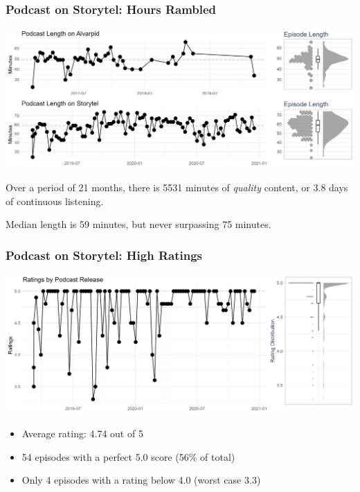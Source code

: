 \begin{frame}
    \frametitle{Podcast on Storytel: Hours Rambled}
    \includegraphics[width=\textwidth]{../R/figures/iskisur_length}

    Over a period of 21 months, there is 5531 minutes of \emph{quality} content, or 3.8 days of continuous
    listening.

    Median length is 59 minutes, but never surpassing 75 minutes.

\end{frame}

\begin{frame}
    \frametitle{Podcast on Storytel: High Ratings}
    \includegraphics[width=\textwidth]{../R/figures/iskisur_ratings}
    \begin{itemize}
        \item Average rating: 4.74 out of 5
        \item 54 episodes with a perfect 5.0 score (56\% of total)
        \item Only 4 episodes with a rating below 4.0 (worst case 3.3)
    \end{itemize}
\end{frame}

